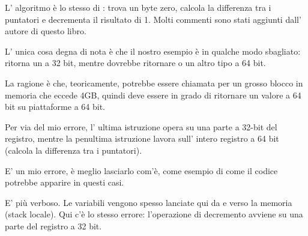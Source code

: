 ﻿




L' algoritmo è lo stesso di : 
trova un byte zero, 
calcola la differenza tra i puntatori e decrementa il risultato di 1.
Molti commenti sono stati aggiunti dall' autore di questo libro.

L' unica cosa degna di nota è che il nostro esempio è in qualche modo sbagliato: \\
 ritorna  un \Tint a 32 bit, mentre dovrebbe ritornare  o un altro tipo a  64 bit.

La ragione è che, teoricamente,  potrebbe essere chiamata per un grosso blocco in memoria che eccede
4GB, quindi deve essere in grado di ritornare un valore a 64 bit su piattaforme a 64 bit.

Per via del mio errore, l' ultima istruzione \SUB opera su una parte a 32-bit del registro, mentre la penultima istruzione
\SUB lavora sull' intero registro a 64 bit (calcola la differenza tra i puntatori).

E' un mio errore, è meglio lasciarlo com'è, come esempio di come il codice potrebbe apparire in questi casi.




E' più verboso.
Le variabili vengono spesso lanciate qui da e verso la memoria (stack locale).
Qui c'è lo stesso errore: l'operazione di decremento avviene su una parte del registro a 32 bit.
